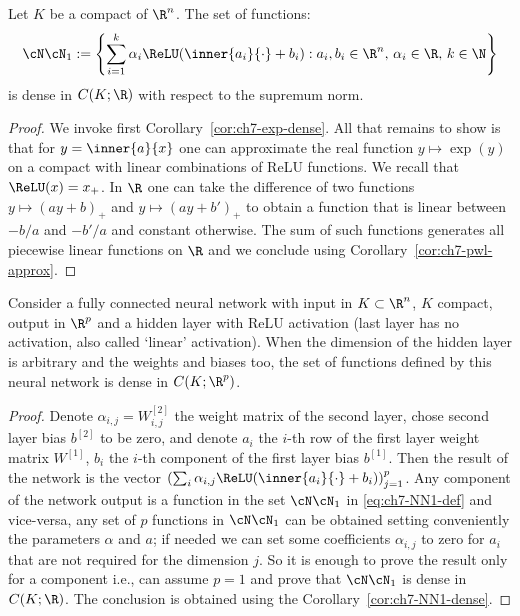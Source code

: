 \begin{corollary}\label{cor:ch7-NN1-dense}
Let $K$ be a compact of $\R^n$. The set of functions:
\begin{equation}\label{eq:ch7-NN1-def}
  \cN\cN_1 := \left\{ \sum_{i=1}^{k} \alpha_i \ReLU(\inner{a_i}{\cdot} + b_i) : a_i, b_i \in \R^n,\, \alpha_i \in \R,\, k \in \N \right\}
\end{equation}
is dense in $C(K; \R)$ with respect to the supremum norm.
\end{corollary}

\begin{proof}
We invoke first Corollary~\ref{cor:ch7-exp-dense}. All that remains to show is that for $y = \inner{a}{x}$ one can approximate the real function $y \mapsto \exp(y)$ on a compact with linear combinations of ReLU functions. We recall that $\ReLU(x) = x_+$. In $\R$ one can take the difference of two functions $y \mapsto (ay + b)_+$ and $y \mapsto (ay + b')_+$ to obtain a function that is linear between $-b/a$ and $-b'/a$ and constant otherwise. The sum of such functions generates all piecewise linear functions on $\R$ and we conclude using Corollary~\ref{cor:ch7-pwl-approx}.
\end{proof}

\begin{proposition}\label{prop:ch7-universal-approx}
Consider a fully connected neural network with input in $K \subset \R^n$, $K$ compact, output in $\R^p$ and a hidden layer with ReLU activation (last layer has no activation, also called `linear' activation). When the dimension of the hidden layer is arbitrary and the weights and biases too, the set of functions defined by this neural network is dense in $C(K; \R^p)$.
\end{proposition}

\begin{proof}
Denote $\alpha_{i,j} = W^{[2]}_{i,j}$ the weight matrix of the second layer, chose second layer bias $b^{[2]}$ to be zero, and denote $a_i$ the $i$-th row of the first layer weight matrix $W^{[1]}$, $b_i$ the $i$-th component of the first layer bias $b^{[1]}$. Then the result of the network is the vector $\left( \sum_i \alpha_{i,j} \ReLU(\inner{a_i}{\cdot} + b_i) \right)_{j=1}^{p}$. Any component of the network output is a function in the set $\cN\cN_1$ in \eqref{eq:ch7-NN1-def} and vice-versa, any set of $p$ functions in $\cN\cN_1$ can be obtained setting conveniently the parameters $\alpha$ and $a$; if needed we can set some coefficients $\alpha_{i,j}$ to zero for $a_i$ that are not required for the dimension $j$. So it is enough to prove the result only for a component i.e., can assume $p = 1$ and prove that $\cN\cN_1$ is dense in $C(K; \R)$. The conclusion is obtained using the Corollary~\ref{cor:ch7-NN1-dense}.
\end{proof}

